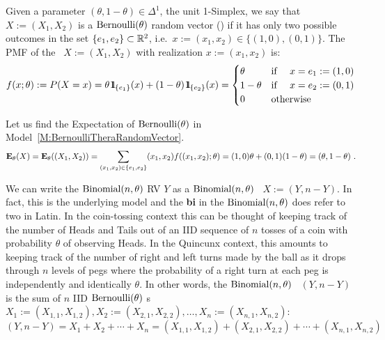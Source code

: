 \begin{model}[$\bernoulli(\theta)$ \rv]\label{M:BernoulliTheraRandomVector}
Given a parameter $(\theta, 1-\theta) \in \Delta^1$, the unit 1-Simplex, we say that $X := (X_1,X_2)$ is a $\bernoulli(\theta)$ random vector (\rv) if it has only two possible outcomes in the set $\{e_1,e_2\} \subset \mathbb{R}^2$, i.e.~$x:=(x_1,x_2) \in \{(1,0),(0,1)\}$.  The PMF of the \rv~$X:= (X_1,X_2)$ with realization $x:=(x_1,x_2)$ is:
\[
f(x;\theta) := P(X=x) = \theta \, {1}\mspace{-11 mu}{1}_{\{e_1\}}(x) + (1-\theta) \, {1}\mspace{-11 mu}{1}_{\{e_2\}}(x) =
\begin{cases}
\theta & \text{if } \quad x=e_1:=(1,0) \\
1- \theta & \text{if } \quad x=e_2:=(0,1) \\
0 & \text{otherwise}
\end{cases}
\]
\end{model}


\begin{example}\label{EgExpectationOfBernoulliRVector}
Let us find the Expectation of $\bernoulli(\theta)$ \rv in Model~\ref{M:BernoulliTheraRandomVector}.
\[
\mathbf{E}_{\theta}(X) = \mathbf{E}_{\theta}((X_1,X_2)) = \sum_{(x_1,x_2) \in \{e_1,e_2\}} (x_1,x_2) f((x_1,x_2);\theta) = (1,0) \theta + (0,1) (1-\theta) = (\theta,1-\theta) \ .
\]
\end{example}


\begin{rem}
We can write the $\mbox{{\rm Binomial}}(n,\theta)$ RV $Y$ as a $\mbox{{\rm Binomial}}(n,\theta)$ \rv~$X:=(Y,n-Y)$.  In fact, this is the underlying model and the {\bf bi} in the $\mbox{{\rm Binomial}}(n,\theta)$ does refer to two in Latin.  In the coin-tossing context this can be thought of keeping track of the number of Heads and Tails out of an IID sequence of $n$ tosses of a coin with probability $\theta$ of observing Heads.  In the Quincunx context, this amounts to keeping track of the number of right and left turns made by the ball as it drops through $n$ levels of pegs where the probability of a right turn at each peg is independently and identically $\theta$.  In other words, the $\mbox{{\rm Binomial}}(n,\theta)$ \rv~$(Y,n-Y)$ is the sum of $n$ IID $\bernoulli(\theta)$ {\rv}s $X_1:=(X_{1,1},X_{1,2}), X_2:=(X_{2,1},X_{2,2}), \ldots, X_n:=(X_{n,1},X_{n,2})$:
\[
(Y,n-Y) = X_1+X_2+\cdots + X_n = (X_{1,1},X_{1,2}) + (X_{2,1},X_{2,2}) + \cdots + (X_{n,1},X_{n,2})
\]
\end{rem}

